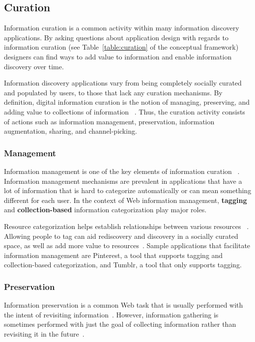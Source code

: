 \documentclass{sigchi}
\begin{document}
{{{\subsection{Curation}
Information curation is a common activity within many information discovery applications. By asking questions about application design with regards to information curation (see Table~\ref{table:curation} of the conceptual framework) designers can find ways to add value to information and enable information discovery over time.

Information discovery applications vary from being completely socially curated and populated by users, to those that lack any curation mechanisms. 
By definition, digital information curation is the notion of managing, preserving, and adding value to collections of information ~\cite{beagrie2008digital,whittaker2011personal}. Thus, the curation activity consists of actions such as information management, preservation, information augmentation, sharing, and channel-picking.

{\subsubsection{Management}
Information management is one of the key elements of information curation ~\cite{beagrie2008digital,whittaker2011personal}. Information management mechanisms are prevalent in applications that have a lot of information that is hard to categorize automatically or can mean something different for each user. In the context of Web information management, \textbf{tagging} and \textbf{collection-based} information categorization play major roles.

Resource categorization helps establish relationships between various resources ~\cite{beagrie2008digital,whittaker2011personal}. Allowing people to tag can aid rediscovery and discovery in a socially curated space, as well as add more value to resources~\cite{gruber2007ontology}. Sample applications that facilitate information management are Pinterest, a tool that supports tagging and collection-based categorization, and Tumblr, a tool that only supports tagging.
} %

{\subsubsection{Preservation}
Information preservation is a common Web task that is usually performed with the intent of revisiting information~\cite{abrams1998information,whittaker2011personal}. However, information gathering is sometimes performed with just the goal of collecting information rather than revisiting it in the future~\cite{lindley2012s}. 

}}}}
\end{document}
